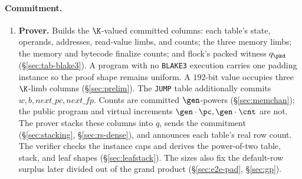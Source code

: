 \paragraph{Commitment.}
\begin{enumerate}
\item \textbf{Prover.} Builds the $\K$-valued committed columns: each table's state, operands, addresses, read-value limbs, and counts; the three memory limbs; the memory and bytecode finalize counts; and flock's packed witness $q_\pkd$ (\S\ref{sec:tab-blake3}). A program with no \texttt{BLAKE3} execution carries one padding instance so the proof shape remains uniform. A $192$-bit value occupies three $\K$-limb columns (\S\ref{sec:prelim}). The \texttt{JUMP} table additionally commits $w,b,\mathit{next\_pc},\mathit{next\_fp}$. Counts are committed $\gen$-powers (\S\ref{sec:memchan}); the public program and virtual increments $\gen\cdot\pc,\gen\cdot\cnt$ are not. The prover stacks these columns into $q$, sends the commitment (\S\ref{sec:stacking}, \S\ref{sec:rs-dense}), and announces each table's real row count. The verifier checks the instance caps and derives the power-of-two table, stack, and leaf shapes (\S\ref{sec:leafstack}). The sizes also fix the default-row surplus later divided out of the grand product (\S\ref{sec:e2e-pad}, \S\ref{sec:gp}).
\end{enumerate}

